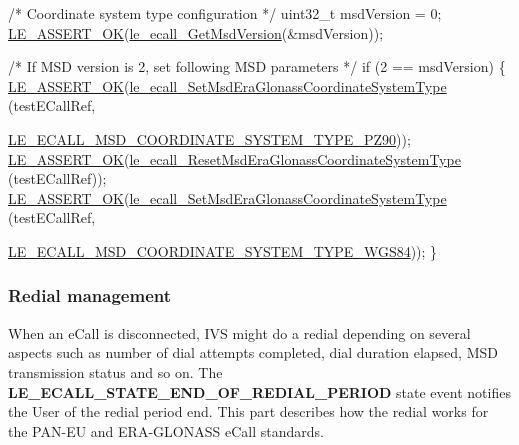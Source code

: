 \begin{DoxyCodeInclude}
    \textcolor{comment}{/* Coordinate system type configuration */}
    uint32\_t msdVersion = 0;
    \hyperlink{le__log_8h_a7cd2daa3d4af1de4d29e0eed95187484}{LE\_ASSERT\_OK}(\hyperlink{le__ecall__interface_8h_a4875975bc3f3c8fb78b43ae40322eedd}{le\_ecall\_GetMsdVersion}(&msdVersion));

    \textcolor{comment}{/* If MSD version is 2, set following MSD parameters */}
    \textcolor{keywordflow}{if} (2 == msdVersion)
    \{
        \hyperlink{le__log_8h_a7cd2daa3d4af1de4d29e0eed95187484}{LE\_ASSERT\_OK}(\hyperlink{le__ecall__interface_8h_aba15bc78d2e03b5bf8c16ee366fb39b9}{le\_ecall\_SetMsdEraGlonassCoordinateSystemType}
      (testECallRef,
                                                 
      \hyperlink{le__ecall__interface_8h_a598bec665c1563eae7a153662e51f446a34ec7e90e068e0979628414832ce3865}{LE\_ECALL\_MSD\_COORDINATE\_SYSTEM\_TYPE\_PZ90}));
        \hyperlink{le__log_8h_a7cd2daa3d4af1de4d29e0eed95187484}{LE\_ASSERT\_OK}(\hyperlink{le__ecall__interface_8h_a7ca8cd2cfbf76310d1e65d34dfc3b220}{le\_ecall\_ResetMsdEraGlonassCoordinateSystemType}
      (testECallRef));
        \hyperlink{le__log_8h_a7cd2daa3d4af1de4d29e0eed95187484}{LE\_ASSERT\_OK}(\hyperlink{le__ecall__interface_8h_aba15bc78d2e03b5bf8c16ee366fb39b9}{le\_ecall\_SetMsdEraGlonassCoordinateSystemType}
      (testECallRef,
                                                 
      \hyperlink{le__ecall__interface_8h_a598bec665c1563eae7a153662e51f446af00789f30f127707615c1dba7f2f8416}{LE\_ECALL\_MSD\_COORDINATE\_SYSTEM\_TYPE\_WGS84}));
    \}
\end{DoxyCodeInclude}
 \hypertarget{c_SDD_eCall_le_ecall_redial}{}\subsubsection{Redial management}\label{c_SDD_eCall_le_ecall_redial}
When an e\+Call is disconnected, I\+VS might do a redial depending on several aspects such as number of dial attempts completed, dial duration elapsed, M\+SD transmission status and so on. The {\bfseries L\+E\+\_\+\+E\+C\+A\+L\+L\+\_\+\+S\+T\+A\+T\+E\+\_\+\+E\+N\+D\+\_\+\+O\+F\+\_\+\+R\+E\+D\+I\+A\+L\+\_\+\+P\+E\+R\+I\+OD} state event notifies the User of the redial period end. This part describes how the redial works for the P\+A\+N-\/\+EU and E\+R\+A-\/\+G\+L\+O\+N\+A\+SS e\+Call standards.


